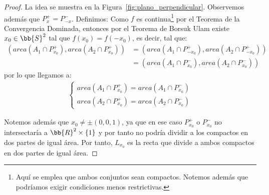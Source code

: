 \begin{teo}
\begin{proof}
        La idea se muestra en la Figura~\ref{fig:plano_perpendicular}. Observemos además que $P_x^+=P_{-x}^-$. Definimos:
        Como $f$ es continua\footnote{Aquí se emplea que ambos conjuntos sean compactos. Notemos además que podríamos exigir condiciones menos restrictivas.} por el Teorema de la Convergencia Dominada, entonces por el Teorema de Borsuk Ulam existe $x_0\in \bb{S}^2$ tal que $f(x_0)=f(-x_0)$, es decir, tal que:
        \begin{align*}
            (area(A_1\cap P_{x_0}^+), area(A_2\cap P_{x_0}^+)) &= (area(A_1\cap P_{-x_0}^+), area(A_2\cap P_{-x_0}^+))\\
            &=(area(A_1\cap P_{x_0}^-), area(A_2\cap P_{x_0}^-))
        \end{align*}
        por lo que llegamos a:
        \begin{gather*}
            \left\{
                \begin{array}{l}
                    area(A_1\cap P_{x_0}^+) = area(A_1\cap P_{x_0}^-)\\
                    area(A_2\cap P_{x_0}^+) = area(A_2\cap P_{x_0}^-)
                \end{array}
            \right.
        \end{gather*}

        Notemos además que $x_0\neq \pm (0,0,1)$, ya que en ese caso $P_{x_0}^+$ o $P_{x_0}^-$ no intersectaría a $\bb{R}^2\times\{1\}$ y por tanto no podría dividir a los compactos en dos partes de igual área. Por tanto, $L_{x_0}$ es la recta que divide a ambos compactos en dos partes de igual área.
    \end{proof}
\end{teo}

